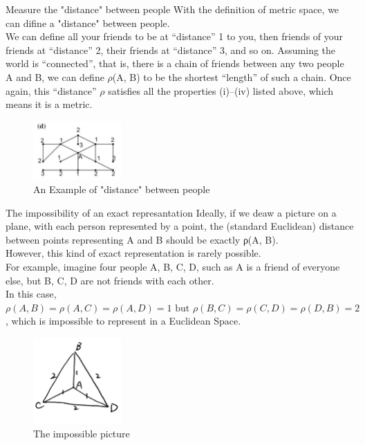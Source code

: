 \documentclass[xcolor=dvipsnames]{beamer}
\theoremstyle{remark}
\begin{document}
\begin{frame}{Measure the "distance" between people}
  \hspace*{2em}With the definition of metric space, we can difine a "distance" between people.\\
  \hspace*{2em}We can define all your friends to be at “distance” 1 to you, then friends of your friends at “distance” 2, their friends at “distance” 3, and so on. Assuming the world is “connected”, that is, there is a chain of friends between any two people A and B, we can define $\rho$(A, B) to be the shortest “length” of such a chain. 
  \hspace*{2em}Once again, this “distance” $\rho$ satisfies all the properties (i)–(iv) listed above, which means it is a metric. \\
  \begin{figure}[H] %
    \centering       %
    \includegraphics[width=0.3\textwidth]{fig2.png} %
    \caption{An Example of "distance" between people} %
    \label{Fig2}   %
\end{figure}
\end{frame}

\begin{frame}{The impossibility of an exact represantation}
  Ideally, if we deaw a picture on a plane, with each person represented by a point, the (standard Euclidean) distance between points representing A and B should be exactly ρ(A, B).\\
  However, this kind of exact representation is rarely possible.\\
  For example, imagine four people A, B, C, D, such as A is a friend of everyone else, but B, C, D are not friends with each other.\\
  In this case, $\rho(A, B) = \rho(A, C) = \rho(A, D) = 1 \text{ but } \rho(B, C) = \rho(C, D) = \rho(D, B) = 2$, which is impossible to represent in a Euclidean Space.\\
  \begin{figure}[H] %
    \centering       %
    \includegraphics[width=0.3\textwidth]{fig3.jpg} %
    \caption{The impossible picture} %
    \label{Fig3}   %
\end{figure}
\end{frame}
\end{document}
